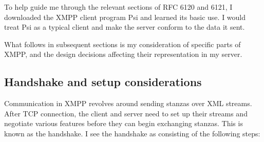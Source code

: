 To help guide me through the relevant sections of RFC 6120 and 6121, I downloaded the XMPP client program Psi\cite{Psi-IM} and learned its basic use. I would treat Psi as a typical client and make the server conform to the data it sent.

What follows in subsequent sections is my consideration of specific parts of XMPP, and the design decisions affecting their representation in my server.

\subsection{Handshake and setup considerations}\label{sec:prep-handshake}
Communication in XMPP revolves around sending stanzas over XML streams. After TCP connection, the client and server need to set up their streams and negotiate various features before they can begin exchanging stanzas. This is known as the handshake. I see the handshake as consisting of the following steps:
